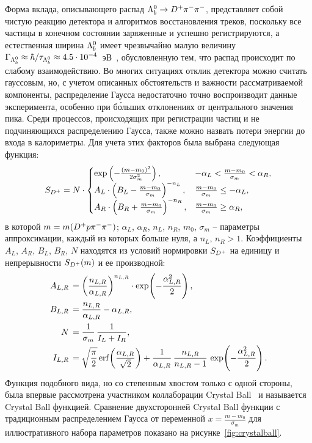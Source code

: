 Форма вклада, описывающего распад $\Lb\to\Dp\pim\pim$, представляет 
собой чистую реакцию детектора и алгоритмов восстановления треков, 
поскольку все частицы в конечном состоянии заряженные и успешно 
регистрируются, а естественная ширина ${\Lambda_b^0}$ имеет чрезвычайно малую 
величину $\Gamma_\Lb\rep{\approx} \hbar/\tau_\Lb\rep{\approx} 
4.5\cdot10^{-4}$~эВ~\cite{PDG}, обусловленную тем, что распад происходит 
по слабому взаимодействию.
%
Во многих ситуациях отклик детектора можно считать гауссовым, но, 
с учетом описанных обстоятельств и важности рассматриваемой компоненты, 
распределение Гаусса недостаточно точно воспроизводит данные 
эксперимента, особенно при б\'{о}льших отклонениях от центрального 
значения пика. Среди процессов, происходящих при регистрации частиц и не 
подчиняющихся распределению Гаусса, также можно назвать потери энергии 
до входа в калориметры.
%
Для учета этих факторов была выбрана следующая функция:
\[%
  S_{\Dp} = N\cdot
  \begin{cases}
    \exp\left(-\frac{(m-m_0)^2}{2\sigma_m^2}\right), &
    -\alpha_L < \frac{m-m_0}{\sigma_m} < \alpha_R, \\
    A_L\cdot\left(B_L - \frac{m-m_0}{\sigma_m}\right)^{-n_L},
    & \frac{m-m_0}{\sigma_m} \leq -\alpha_L, \\
    A_R\cdot\left(B_R + \frac{m-m_0}{\sigma_m}\right)^{-n_R},
    & \frac{m-m_0}{\sigma_m} \geq \alpha_R, 
  \end{cases}
\]%
в которой $m = m({D^+} p{\pi^-}{\pi^-})$; $\alpha_L$, $\alpha_R$, $n_L$, $n_R$, 
$m_0$, $\sigma_m$ -- параметры аппроксимации, каждый из которых больше 
нуля, а $n_L,\,n_R>1$. Коэффициенты $A_L$, $A_R$, $B_L$, $B_R$, $N$ 
находятся из условий нормировки $S_{{D^+}}$ на единицу и непрерывности 
$S_{{D^+}}(m)$ и ее производной:
\[\begin{aligned}%
  A_{L,R} \,&= \left(\frac{n_{L,R}}{\alpha_{L,R}}\right)^{n_{L,R}}
  \cdot \exp\!\left({-\frac{\alpha_{L,R}^2}{2}}\right), \\ 
B_{L,R} \,&= \frac{n_{L,R}}{\alpha_{L,R}} - \alpha_{L,R}, \\ 
N \,&= \frac{1}{\sigma_m} \, \frac{1}{I_L + I_R}, \\
I_{L,R} \,&= \sqrt{\frac{\pi}{2}}\,\erf{\frac{\alpha_{L,R}}{\sqrt{2}} } + 
\frac{1}{\alpha_{L,R}}\,\frac{n_{L,R}}{n_{L,R}-1}\,\exp\!\left({-\frac{\alpha_{L,R}^2}{2}}\right).
\end{aligned}\]%
Функция подобного вида, но со степенным хвостом только с одной стороны, 
была впервые рассмотрена участником коллаборации Crystal 
Ball~\cite{CrystalBall-function} и называется Crystal Ball функцией. 
Сравнение двухсторонней Crystal Ball функции с традиционным 
распределением Гаусса от переменной $x=\frac{m-m_0}{\sigma_m}$ для 
иллюстративного набора параметров показано на 
рисунке~\ref{fig:crystalball}.

